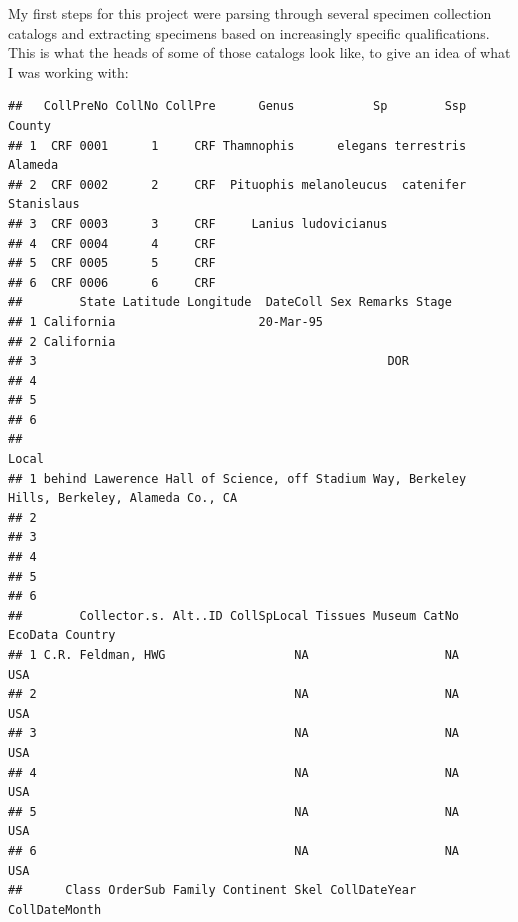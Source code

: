 \documentclass[
]{article}
\begin{document}
My first steps for this project were parsing through several specimen
collection catalogs and extracting specimens based on increasingly
specific qualifications. This is what the heads of some of those
catalogs look like, to give an idea of what I was working with:

\begin{verbatim}
##   CollPreNo CollNo CollPre      Genus           Sp        Ssp      County
## 1  CRF 0001      1     CRF Thamnophis      elegans terrestris    Alameda 
## 2  CRF 0002      2     CRF  Pituophis melanoleucus  catenifer Stanislaus 
## 3  CRF 0003      3     CRF     Lanius ludovicianus                       
## 4  CRF 0004      4     CRF                                               
## 5  CRF 0005      5     CRF                                               
## 6  CRF 0006      6     CRF                                               
##        State Latitude Longitude  DateColl Sex Remarks Stage
## 1 California                    20-Mar-95                  
## 2 California                                               
## 3                                                 DOR      
## 4                                                          
## 5                                                          
## 6                                                          
##                                                                                          Local
## 1 behind Lawerence Hall of Science, off Stadium Way, Berkeley Hills, Berkeley, Alameda Co., CA
## 2                                                                                             
## 3                                                                                             
## 4                                                                                             
## 5                                                                                             
## 6                                                                                             
##        Collector.s. Alt..ID CollSpLocal Tissues Museum CatNo EcoData Country
## 1 C.R. Feldman, HWG                  NA                   NA             USA
## 2                                    NA                   NA             USA
## 3                                    NA                   NA             USA
## 4                                    NA                   NA             USA
## 5                                    NA                   NA             USA
## 6                                    NA                   NA             USA
##      Class OrderSub Family Continent Skel CollDateYear CollDateMonth

\end{verbatim}
\end{document}
